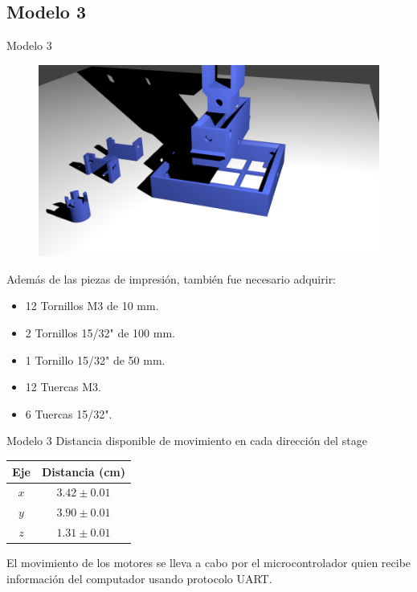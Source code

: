 \documentclass{beamer}
\begin{document}
    \subsection{Modelo 3}
    \begin{frame}{Modelo 3}
        \begin{figure}[h]
        	\centering
        	\includegraphics[width=0.5\linewidth]{figures/model3.png}
        \end{figure}
        
        Además de las piezas de impresión, también fue necesario adquirir:
        \begin{itemize}
        	\item 12 Tornillos M3 de 10 mm.
        	\item 2 Tornillos 15/32" de 100 mm.
        	\item 1 Tornillo 15/32" de 50 mm.
        	\item 12 Tuercas M3.
        	\item 6 Tuercas 15/32".
        \end{itemize}
    \end{frame}
    
    \begin{frame}{Modelo 3}
    	Distancia disponible de movimiento en cada dirección del stage
    	\begin{table}[h]
    		\centering
    		\begin{tabular}{cc}
    			\hline
    			\textbf{Eje} & \textbf{Distancia (cm)} \\
    			\hline
    			$x$ & $3.42 \pm 0.01$ \\
    			$y$ & $3.90 \pm 0.01$ \\
    			$z$ & $1.31 \pm 0.01$ \\
    			\hline		
    		\end{tabular}
    	\end{table}
    	El movimiento de los motores se lleva a cabo por el microcontrolador quien recibe información del computador usando protocolo UART.
    \end{frame}
    
\end{document}
